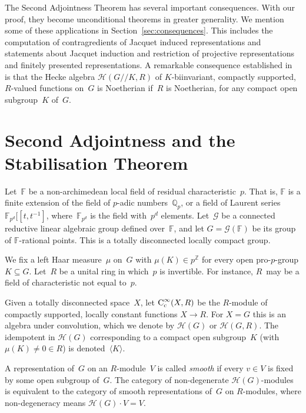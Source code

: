 \documentclass{amsart}
\theoremstyle{remark}
\theoremstyle{definition}
\newcommand*{\nb}{\nobreakdash}%
\newcommand*{\idem}[1]{\langle#1\rangle}%
\newcommand*{\Z}{\mathbb Z}%
\newcommand*{\Q}{\mathbb Q}%
\newcommand*{\F}{\mathbb F}%
\newcommand*{\Ccinf}[1][\infty]{\textup C_\textup c^{#1}}%
\newcommand*{\Galg}{\mathcal G}%
\newcommand{\ring}{R}%
\newcommand*{\Hecke}{\mathcal H}%
\begin{document}
The Second Adjointness Theorem has several important consequences.  With our proof, they become unconditional theorems in greater generality.  We mention some of these applications in Section~\ref{sec:consequences}.  This includes the computation of contragredients of Jacquet induced representations and statements about Jacquet induction and restriction of projective representations and finitely presented representations.  A remarkable consequence established in~\cite{Dat:Finitude} is that the Hecke algebra \(\Hecke(G/\!\!/K,\ring)\) of \(K\)\nb-biinvariant, compactly supported, \(\ring\)\nb-valued functions on~\(G\) is Noetherian if~\(\ring\) is Noetherian, for any compact open subgroup~\(K\) of~\(G\).


\section{Second Adjointness and the Stabilisation Theorem}
\label{sec:Jacquet}

Let~\(\F\) be a non-archimedean local field of residual characteristic~\(p\).  That is, \(\F\) is a finite extension of the field of \(p\)\nb-adic numbers~\(\Q_p\), or a field of Laurent series \(\F_{p^d}[\![t,t^{-1}]\), where~\(\F_{p^d}\) is the field with~\(p^d\) elements.  Let~\(\Galg\) be a connected reductive linear algebraic group defined over~\(\F\), and let \(G = \Galg (\F)\) be its group of \(\F\)\nb-rational points.  This is a totally disconnected locally compact group.

We fix a left Haar measure~\(\mu\) on~\(G\) with \(\mu(K) \in p^\Z\) for every open pro-\(p\)-group \(K \subseteq G\).  Let~\(\ring\) be a unital ring in which~\(p\) is invertible.  For instance, \(\ring\)~may be a field of characteristic not equal to~\(p\).

Given a totally disconnected space~\(X\), let \(\Ccinf(X,\ring)\) be the \(\ring\)\nb-module of compactly supported, locally constant functions \(X\to \ring\).  For \(X = G\) this is an algebra under convolution, which we denote by \(\Hecke(G)\) or \(\Hecke(G,\ring)\).  The idempotent in \(\Hecke(G)\) corresponding to a compact open subgroup~\(K\) (with \(\mu(K) \neq 0 \in \ring\)) is denoted~\(\idem{K}\).

A representation of~\(G\) on an \(\ring\)\nb-module~\(V\) is called \emph{smooth} if every \(v\in V\) is fixed by some open subgroup of~\(G\).  The category of non-degenerate \(\Hecke(G)\)\nb-modules is equivalent to the category of smooth representations of~\(G\) on \(\ring\)\nb-modules, where non-degeneracy means \(\Hecke(G)\cdot V= V\).
\end{document}
